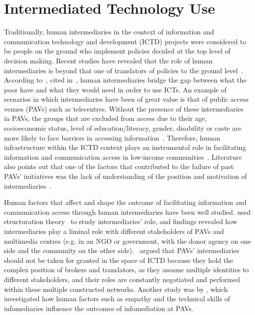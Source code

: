 \section{Intermediated Technology Use}
Traditionally, human intermediaries in the context of information and communication technology and development (ICTD) projects were considered to be people on the ground who implement policies decided at the top level of decision making. Recent studies have revealed that the role of human intermediaries is beyond that one of translators of policies to the ground level~\citep{bailur2010liminal}. According to~\cite{heeks1999tyranny}, cited in~\cite{bailur2012complex}, human intermediaries bridge the gap between what the poor have and what they would need in order to use ICTs. An example of  scenarios in which intermediaries have been of great value is that of public access venues (PAVs) such as telecentres. Without the presence of these intermediaries in PAVs, the groups that are excluded from access due to their age, socioeconomic status, level of education/literacy, gender, disability or caste are more likely to face barriers in accessing information~\citep{ramirez2013infomediaries}. Therefore, human infrastructure within the ICTD context plays an instrumental role in facilitating information and communication access in low-income communities~\citep{sambasivan2010human}. Literature also points out that one of the factors that contributed to the failure of past PAVs' initiatives was the lack of understanding of the position and motivation of intermediaries~\citep{bailur2010liminal}.
 
Human factors that affect and shape the outcome of facilitating information and communication access through human intermediaries have been well studied. \cite{bailur2010liminal} used structuration theory~\citep{jones2008giddens} to study intermediaries' role, and findings revealed how intermediaries play a liminal role with different stakeholders of PAVs and multimedia centres (e.g. in an NGO or government, with the donor agency on one side and the community on the other side).~\cite{bailur2012complex} argued that PAVs' intermediaries should not be taken for granted in the space of ICTD because they hold the complex position of brokers and translators, as they assume multiple identities to different stakeholders, and their roles are constantly negotiated and performed within these multiple constructed networks. Another study was by \cite{ramirez2013infomediaries}, which investigated how human factors such as empathy and the technical skills of infomediaries influence the outcomes of infomediation at PAVs. 

